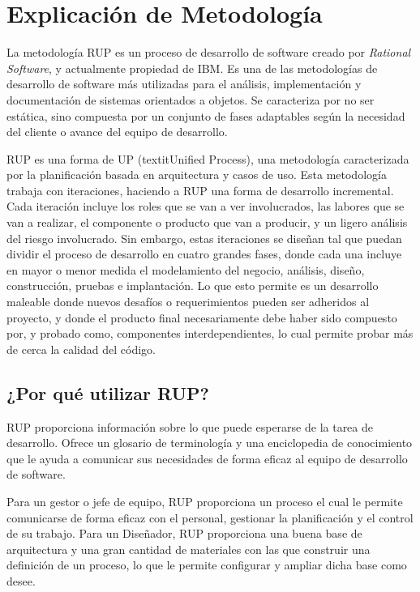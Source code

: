 \documentclass[spanish]{udpreport}
\begin{document}
\chapter{Explicación de Metodología}
La metodología RUP es un proceso de desarrollo de software creado por \textit{Rational Software}, y actualmente propiedad de IBM. Es una de las metodologías de desarrollo de software más utilizadas para el análisis, implementación y documentación de sistemas orientados a objetos. Se caracteriza por no ser estática, sino compuesta por un conjunto de fases adaptables según la necesidad del cliente o avance del equipo de desarrollo.\par
RUP es una forma de UP (textit{Unified Process}), una metodología caracterizada por la planificación basada en arquitectura y casos de uso. Esta metodología trabaja con iteraciones, haciendo a RUP una forma de desarrollo incremental. Cada iteración incluye los roles que se van a ver involucrados, las labores que se van a realizar, el componente o producto que van a producir, y un ligero análisis del riesgo involucrado. Sin embargo, estas iteraciones se diseñan tal que puedan dividir el proceso de desarrollo en cuatro grandes fases, donde cada una incluye en mayor o menor medida el modelamiento del negocio, análisis, diseño, construcción, pruebas e implantación. Lo que esto permite es un desarrollo maleable donde nuevos desafíos o requerimientos pueden ser adheridos al proyecto, y donde el producto final necesariamente debe haber sido compuesto por, y probado como, componentes interdependientes, lo cual permite probar más de cerca la calidad del código.

\section{¿Por qué utilizar RUP?}
\label{sec: Por que utilizar RUP}
RUP proporciona información sobre lo que puede esperarse de la tarea de desarrollo. Ofrece un glosario de terminología y una enciclopedia de conocimiento que le ayuda a comunicar sus necesidades de forma eficaz al equipo de  desarrollo de software. \par
Para un gestor o jefe de equipo, RUP proporciona  un proceso el cual le permite comunicarse de forma eficaz con el personal, gestionar la planificación y el control de su trabajo. Para un Diseñador, RUP proporciona una buena base de arquitectura y una gran cantidad de materiales con las que construir una definición de un proceso, lo que le permite configurar y ampliar dicha base como desee.
\end{document}
